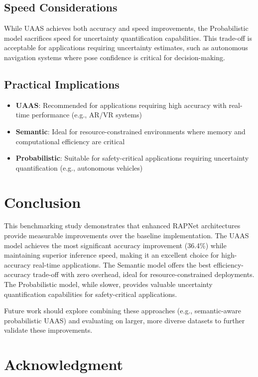 \documentclass[11pt,a4paper]{article}
\begin{document}
\subsection{Speed Considerations}

While UAAS achieves both accuracy and speed improvements, the Probabilistic model sacrifices speed for uncertainty quantification capabilities. This trade-off is acceptable for applications requiring uncertainty estimates, such as autonomous navigation systems where pose confidence is critical for decision-making.

\subsection{Practical Implications}

\begin{itemize}
    \item \textbf{UAAS}: Recommended for applications requiring high accuracy with real-time performance (e.g., AR/VR systems)
    \item \textbf{Semantic}: Ideal for resource-constrained environments where memory and computational efficiency are critical
    \item \textbf{Probabilistic}: Suitable for safety-critical applications requiring uncertainty quantification (e.g., autonomous vehicles)
\end{itemize}

\section{Conclusion}

This benchmarking study demonstrates that enhanced RAPNet architectures provide measurable improvements over the baseline implementation. The UAAS model achieves the most significant accuracy improvement (36.4\%) while maintaining superior inference speed, making it an excellent choice for high-accuracy real-time applications. The Semantic model offers the best efficiency-accuracy trade-off with zero overhead, ideal for resource-constrained deployments. The Probabilistic model, while slower, provides valuable uncertainty quantification capabilities for safety-critical applications.

Future work should explore combining these approaches (e.g., semantic-aware probabilistic UAAS) and evaluating on larger, more diverse datasets to further validate these improvements.

\section*{Acknowledgment}
\end{document}
